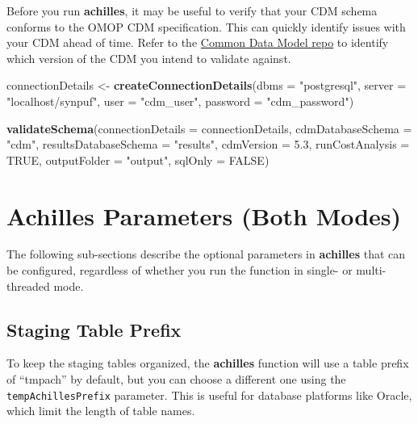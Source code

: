 \documentclass[]{article}
\newenvironment{Shaded}{\begin{snugshade}}{\end{snugshade}}
\newcommand{\KeywordTok}[1]{\textcolor[rgb]{0.13,0.29,0.53}{\textbf{#1}}}
\newcommand{\DataTypeTok}[1]{\textcolor[rgb]{0.13,0.29,0.53}{#1}}
\newcommand{\FloatTok}[1]{\textcolor[rgb]{0.00,0.00,0.81}{#1}}
\newcommand{\StringTok}[1]{\textcolor[rgb]{0.31,0.60,0.02}{#1}}
\newcommand{\OtherTok}[1]{\textcolor[rgb]{0.56,0.35,0.01}{#1}}
\newcommand{\NormalTok}[1]{#1}
\begin{document}
Before you run \textbf{achilles}, it may be useful to verify that your
CDM schema conforms to the OMOP CDM specification. This can quickly
identify issues with your CDM ahead of time. Refer to the
\href{https://github.com/OHDSI/CommonDataModel}{Common Data Model repo}
to identify which version of the CDM you intend to validate against.

\begin{Shaded}
\begin{Highlighting}[]
\NormalTok{connectionDetails <-}\StringTok{ }\KeywordTok{createConnectionDetails}\NormalTok{(}\DataTypeTok{dbms =} \StringTok{"postgresql"}\NormalTok{, }
                                             \DataTypeTok{server =} \StringTok{"localhost/synpuf"}\NormalTok{, }
                                             \DataTypeTok{user =} \StringTok{"cdm_user"}\NormalTok{, }
                                             \DataTypeTok{password =} \StringTok{"cdm_password"}\NormalTok{)}

\KeywordTok{validateSchema}\NormalTok{(}\DataTypeTok{connectionDetails =}\NormalTok{ connectionDetails, }
               \DataTypeTok{cdmDatabaseSchema =} \StringTok{"cdm"}\NormalTok{, }
               \DataTypeTok{resultsDatabaseSchema =} \StringTok{"results"}\NormalTok{, }
               \DataTypeTok{cdmVersion =} \FloatTok{5.3}\NormalTok{, }
               \DataTypeTok{runCostAnalysis =} \OtherTok{TRUE}\NormalTok{, }
               \DataTypeTok{outputFolder =} \StringTok{"output"}\NormalTok{, }
               \DataTypeTok{sqlOnly =} \OtherTok{FALSE}\NormalTok{)}
\end{Highlighting}
\end{Shaded}

\section{Achilles Parameters (Both
Modes)}\label{achilles-parameters-both-modes}

The following sub-sections describe the optional parameters in
\textbf{achilles} that can be configured, regardless of whether you run
the function in single- or multi-threaded mode.

\subsection{Staging Table Prefix}\label{staging-table-prefix}

To keep the staging tables organized, the \textbf{achilles} function
will use a table prefix of ``tmpach'' by default, but you can choose a
different one using the \texttt{tempAchillesPrefix} parameter. This is
useful for database platforms like Oracle, which limit the length of
table names.
\end{document}
